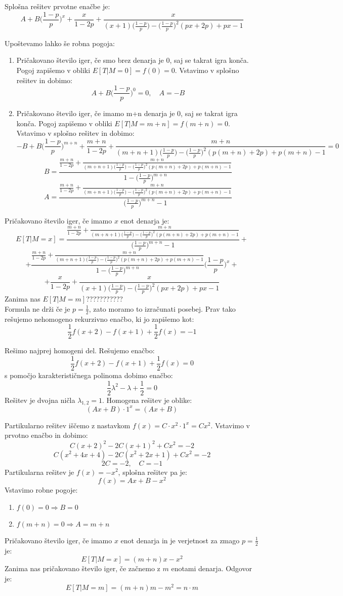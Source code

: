 \documentclass[12pt, a4paper]{article}
\begin{document}
Splošna rešitev prvotne enačbe je: $$A + B\bigg( \frac{1-p}{p} \bigg )^x+\frac{x}{1-2p}+\frac{x}{(x+1)\bigg( \frac{1-p}{p} \bigg )-\bigg( \frac{1-p}{p} \bigg )^2(px+2p)+px-1}$$

Upoštevamo lahko še robna pogoja:
\begin{enumerate}
\item Pričakovano število iger, če smo brez denarja je 0, saj se takrat igra konča. Pogoj zapišemo v obliki $E[T|M= 0] = f(0) = 0$. Vstavimo v splošno rešitev in dobimo:
$$A + B\bigg( \frac{1-p}{p} \bigg )^0 = 0, \quad A = -B$$
\item Pričakovano število iger, če imamo m+n denarja je 0, saj se takrat igra konča. Pogoj zapišemo v obliki $E[T|M= m+n] = f(m+n) = 0$. Vstavimo v splošno rešitev in dobimo:
$$-B + B\bigg( \frac{1-p}{p} \bigg )^{m+n}+\frac{m+n}{1-2p}+\frac{m+n}{(m+n+1)\bigg( \frac{1-p}{p} \bigg )-\bigg( \frac{1-p}{p} \bigg )^2(p(m+n)+2p)+p(m+n)-1}=0$$
$$B = \frac{\frac{m+n}{1-2p}+\frac{m+n}{(m+n+1)\bigg( \frac{1-p}{p} \bigg )-\bigg( \frac{1-p}{p} \bigg )^2(p(m+n)+2p)+p(m+n)-1}}{1-\bigg( \frac{1-p}{p} \bigg )^{m+n}}$$
$$A = \frac{\frac{m+n}{1-2p}+\frac{m+n}{(m+n+1)\bigg( \frac{1-p}{p} \bigg )-\bigg( \frac{1-p}{p} \bigg )^2(p(m+n)+2p)+p(m+n)-1}}{\bigg( \frac{1-p}{p} \bigg )^{m+n}-1}$$
\end{enumerate}

Pričakovano število iger, če imamo $x$ enot denarja je: $$E[ T | M = x]= \frac{\frac{m+n}{1-2p}+\frac{m+n}{(m+n+1)\bigg( \frac{1-p}{p} \bigg )-\bigg( \frac{1-p}{p} \bigg )^2(p(m+n)+2p)+p(m+n)-1}}{\bigg( \frac{1-p}{p} \bigg )^{m+n}-1}+$$ $$+\frac{\frac{m+n}{1-2p}+\frac{m+n}{(m+n+1)\bigg( \frac{1-p}{p} \bigg )-\bigg( \frac{1-p}{p} \bigg )^2(p(m+n)+2p)+p(m+n)-1}}{1-\bigg( \frac{1-p}{p} \bigg )^{m+n}}\bigg( \frac{1-p}{p} \bigg )^x+$$ $$+\frac{x}{1-2p}+\frac{x}{(x+1)\bigg( \frac{1-p}{p} \bigg )-\bigg( \frac{1-p}{p} \bigg )^2(px+2p)+px-1}$$
 Zanima nas $E[T|M=m]$???????????
 \\
 Formula ne drži če je $p = \frac{1}{2}$, zato moramo to izračunati posebej. Prav tako rešujemo nehomogeno rekurzivno enačbo, ki jo zapišemo kot: $$\frac{1}{2}f(x+2)-f(x+1)+\frac{1}{2}f(x)=-1$$

Rešimo najprej homogeni del. Rešujemo enačbo: $$\frac{1}{2}f(x+2)-f(x+1)+\frac{1}{2}f(x)=0$$ s pomočjo karakterističnega polinoma dobimo enačbo: $$\frac{1}{2}\lambda^2-\lambda+\frac{1}{2}=0$$ Rešitev je dvojna ničla $\lambda_{1, 2}= 1$. Homogena rešitev je oblike: $$(Ax+B)\cdot 1^x=(Ax+B)$$

Partikularno rešitev iščemo z nastavkom $f(x)=C\cdot x^2\cdot 1^x= Cx^2$. Vstavimo v prvotno enačbo in dobimo:
$$C(x+2)^2-2C(x+1)^2+Cx^2=-2$$
$$C(x^2+4x+4)-2C(x^2+2x+1)+Cx^2=-2$$
$$2C=-2, \quad C = -1 $$ Partikularna rešitev je $f(x)=-x^2$, splošna rešitev pa je: $$f(x)=Ax+B-x^2$$
Vstavimo robne pogoje:
\begin{enumerate}
\item $f(0)=0\Rightarrow B = 0$
\item $f(m+n)=0 \Rightarrow A = m+n$
\end{enumerate}
Pričakovano število iger, če imamo $x$ enot denarja in je verjetnost za zmago $p=\frac{1}{2}$ je: $$E[T|M=x]= (m+n)x-x^2$$
Zanima nas pričakovano število iger, če začnemo z $m$ enotami denarja. Odgovor je:$$E[T|M=m]=(m+n)m-m^2= n\cdot m$$
\end{document}
